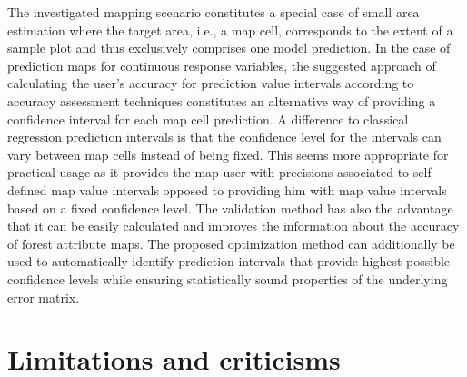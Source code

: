 The investigated mapping scenario constitutes a special case of small area estimation where the target area, i.e., a map cell, corresponds to the extent of a sample plot and thus exclusively comprises one model prediction. In the case of prediction maps for continuous response variables, the suggested approach of calculating the user's accuracy for prediction value intervals according to accuracy assessment techniques constitutes an alternative way of providing a confidence interval for each map cell prediction. A difference to classical regression prediction intervals is that the confidence level for the intervals can vary between map cells instead of being fixed. This seems more appropriate for practical usage as it provides the map user with precisions associated to self-defined map value intervals opposed to providing him with map value intervals based on a fixed confidence level. The validation method has also the advantage that it can be easily calculated and improves the information about the accuracy of forest attribute maps. The proposed optimization method can additionally be used to automatically identify prediction intervals that provide highest possible confidence levels while ensuring statistically sound properties of the underlying error matrix.  



\section{Limitations and criticisms}
\label{sec:synth:limits}

